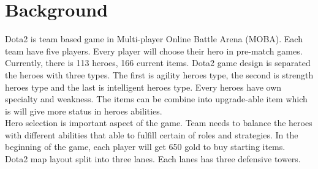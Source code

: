 \section{Background}
\label{sec:background}

Dota2 is team based game in Multi-player Online Battle Arena (MOBA). Each team have five players. Every player will choose their hero in pre-match games. Currently, there is 113 heroes, 166 current items. Dota2 game design is separated the heroes with three types. The first is agility heroes type, the second is strength heroes type and the last is intelligent heroes type. Every heroes have own specialty and weakness. The items can be combine into upgrade-able item which is will give more status in heroes abilities.
\\
Hero selection is important aspect of the game. Team needs to balance the heroes with different abilities that able to fulfill certain of roles and strategies. In the beginning of the game, each player will get 650 gold to buy starting items. 
\\
Dota2 map layout split into three lanes. Each lanes has three defensive towers.